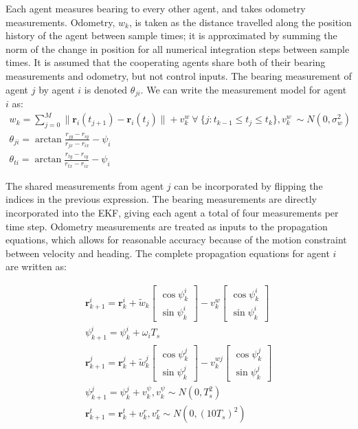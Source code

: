 \documentclass{aiaa-tc}
\newcommand{\B}[1]{\textbf{#1}} %
\begin{document}
Each agent measures bearing to every other agent, and takes odometry measurements. Odometry, $w_k$, is taken as the distance travelled along the position history of the agent between sample times; it is approximated by summing the norm of the change in position for all numerical integration steps between sample times. It is assumed that the cooperating agents share both of their bearing measurements and odometry, but not control inputs. The bearing measurement of agent $j$ by agent $i$ is denoted $\theta_{ji}$. We can write the measurement model for agent $i$ as:
\begin{align}
w_k = \sum\limits_{j=0}^{M} \| \B{r}_i(t_{j+1}) - \B{r}_i(t_j) \| + v^w_k \ \forall \ \{j : t_{k-1} \leq t_j \leq t_{k}\}, v^w_k \ \sim N(0,\sigma_w^2) \\
\theta_{ji} = \arctan{\frac{r_{jy}-r_{iy}}{r_{jx}-r_{ix}}} - \psi_i \\
\theta_{ti} = \arctan{\frac{r_{ty}-r_{iy}}{r_{tx}-r_{ix}}} - \psi_i
\end{align}

The shared measurements from agent $j$ can be incorporated by flipping the indices in the previous expression. The bearing measurements are directly incorporated into the EKF, giving each agent a total of four measurements per time step. Odometry measurements are treated as inputs to the propagation equations, which allows for reasonable accuracy because of the motion constraint between velocity and heading. The complete propagation equations for agent $i$ are written as:

\begin{align}
\B{r}^i_{k+1} = \B{r}^i_k + \tilde{w}_k \begin{bmatrix}
\cos{\psi^i_k}\\
\sin{\psi^i_k}
\end{bmatrix} - v^w_k\begin{bmatrix}
\cos{\psi^i_k}\\
\sin{\psi^i_k}
\end{bmatrix}\\
\psi^i_{k+1} = \psi^i_k + \omega_i T_s\\
\B{r}^j_{k+1} = \B{r}^j_k + \tilde{w}^j_k \begin{bmatrix}
\cos{\psi^j_k}\\
\sin{\psi^j_k}
\end{bmatrix} - v^{wj}_k\begin{bmatrix}
\cos{\psi^j_k}\\
\sin{\psi^j_k}
\end{bmatrix}\\
\psi^j_{k+1} = \psi^j_k + v^\psi_k, v^\psi_k \sim N(0,T_s^2)\\
\B{r}^t_{k+1} = \B{r}^t_k + v^r_k, v^r_k \sim N(0,(10T_s)^2)
\end{align}
\end{document}
